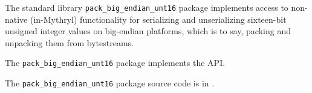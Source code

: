 
The standard library {\tt pack\_big\_endian\_unt16} package implements access to 
non-native (in-Mythryl) functionality for 
serializing and unserializing sixteen-bit unsigned integer values on big-endian platforms, which is to say, 
packing and unpacking them from bytestreams.

The {\tt pack\_big\_endian\_unt16} package implements the 
 API.

The {\tt pack\_big\_endian\_unt16} package source code is in .



